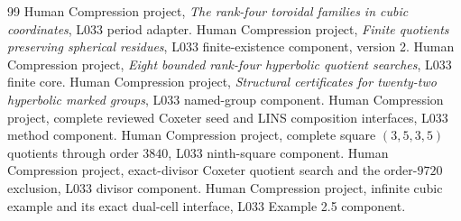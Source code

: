 \documentclass[11pt,a4paper]{article}
\begin{document}
\begin{thebibliography}{99}
 Human Compression project, \emph{The rank-four toroidal
families in cubic coordinates}, L033 period adapter.
 Human Compression project, \emph{Finite quotients
preserving spherical residues}, L033 finite-existence component, version 2.
 Human Compression project, \emph{Eight bounded rank-four
hyperbolic quotient searches}, L033 finite core.
 Human Compression project, \emph{Structural certificates
for twenty-two hyperbolic marked groups}, L033 named-group component.
 Human Compression project, complete reviewed Coxeter
seed and LINS composition interfaces, L033 method component.
 Human Compression project, complete square $(3,5,3,5)$
quotients through order $3840$, L033 ninth-square component.
 Human Compression project, exact-divisor Coxeter
quotient search and the order-$9720$ exclusion, L033 divisor component.
 Human Compression project, infinite cubic example and
its exact dual-cell interface, L033 Example 2.5 component.
\end{thebibliography}
\end{document}
